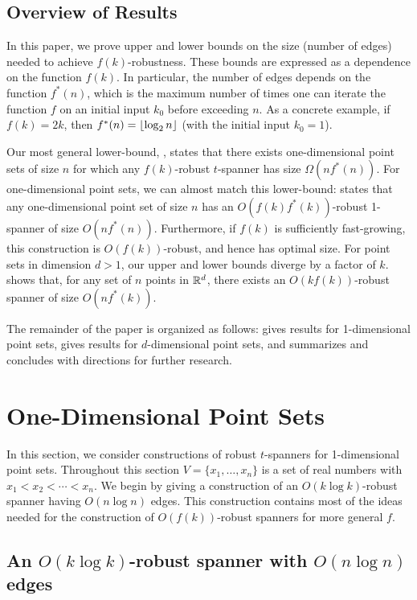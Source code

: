 \documentclass{cccg12}
\begin{document}
\subsection{Overview of Results}

In this paper, we prove upper and lower bounds on the size (number of
edges) needed to achieve $f(k)$-robustness.
These bounds are expressed as a dependence on the function $f(k)$.
In particular, the number of edges depends on the function $f^*(n)$,
which is the maximum number of times one can iterate the function $f$ on
an initial input $k_0$ before exceeding $n$.  As a concrete example, if
$f(k)=2k$, then  $f^*(n)={\lfloor \log_2 n \rfloor}$ (with the initial input $k_0=1$).

Our most general lower-bound, ,
states that there exists one-dimensional point sets of size $n$
for which any $f(k)$-robust $t$-spanner has size $\Omega(nf^*(n))$.
For one-dimensional point sets, we can almost match this lower-bound:
 states that any one-dimensional point set of size
$n$ has an $O(f(k)f^*(k))$-robust 1-spanner of size $O(nf^*(n))$.
Furthermore, if $f(k)$ is sufficiently fast-growing, this construction
is $O(f(k))$-robust, and hence has optimal size.  For point sets in
dimension $d>1$, our upper and lower bounds diverge by a factor of $k$.
 shows that, for any set of $n$ points in $\mathbb{R}^d$, there exists
an $O(kf(k))$-robust spanner of size $O(nf^*(k))$.

The remainder of the paper is organized as follows:  
gives results for 1-dimensional point sets,  gives results
for $d$-dimensional point sets, and  summarizes and
concludes with directions for further research.


\section{One-Dimensional Point Sets}

In this section, we consider constructions of robust $t$-spanners for
1-dimensional point sets.  Throughout this section $V=\{x_1,\ldots,x_n\}$
is a set of real numbers with $x_1<x_2<\cdots<x_n$.  We begin by giving
a construction of an $O(k\log k)$-robust spanner having $O(n\log n)$
edges.  This construction contains most of the ideas needed for the
construction of $O(f(k))$-robust spanners for more general $f$.

\subsection{An $O(k\log k)$-robust spanner with $O(n\log n)$ edges}
\end{document}
